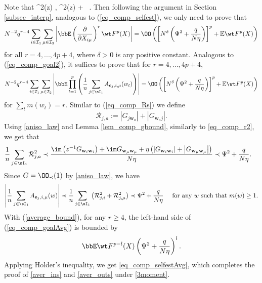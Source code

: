 Note that
\be\label{psi2}
\Psi^2(z) \lesssim {}, \quad {} \quad \Psi^2(z) \lesssim {} +  \ .
\ee
Then following the argument in Section \ref{subsec_interp}, analogous to (\ref{eq_comp_selfest}), we only need to prove that
\begin{equation}\label{eq_comp_selfestAvg}
N^{-2}q^{r-4}\sum_{i\in\mathcal I_1}\sum_{\mu\in\mathcal I_2}\left|\bbE \left(\frac{\partial}{\partial X_{i\mu}}\right)^r\wt F^p(X)\right|=\OO\left(\left[N^{\delta}\left(\Psi^2+\frac{q}{N\eta}\right)\right]^p+\mathbb E\wt F^p(X)\right)
\end{equation}
for all $r=4,...,4p+4$, where $\delta>0$ is any positive constant. Analogous to (\ref{eq_comp_goal2}), it suffices to prove that for $r=4,...,4p+4$,
\begin{equation}\label{eq_comp_goalAvg}
N^{-2}q^{r-4}\sum_{i\in\mathcal I_1}\sum_{\mu\in\mathcal I_2}\left|\bbE\prod_{t=1}^{p}\left(\frac{1}{n}\sum_{j\in\sI_1}A_{ \mathbf e_j, i, \mu}(w_t)\right)\right|=\OO\left(\left[N^{\delta}\left(\Psi^2+\frac{q}{N\eta}\right)\right]^p+\mathbb E\wt F^p(X)\right)
\end{equation}
for $\sum_t m(w_t)=r$. 
Similar to (\ref{eq_comp_Rs}) we define
\begin{equation}\nonumber%
\mathcal R_{j, a}:=| G_{j \mathbf w_a}|+| G_{\mathbf w_a j}|.
\end{equation}
Using \eqref{aniso_law} and Lemma \ref{lem_comp_gbound}, similarly to \eqref{eq_comp_r2}, we get that
\begin{equation}\label{eq_comp_r22}
\begin{split}
 \frac{1}{n}\sum_{j\in\sI_1}\mathcal R_{j,a}^2 & \prec \frac{ \im \left(z^{-1}G_{\mathbf w_i\mathbf w_i}\right) + \im G_{\mathbf w_\mu\mathbf w_\mu} + \eta\left(\left| G_{\mathbf w_i\mathbf w_i} \right|+ \left| G_{\mathbf w_\mu \mathbf w_\mu} \right|\right)}{N\eta} \prec \Psi^2+\frac{q}{N\eta}.
 \end{split}
\end{equation}
Since $G=\OO_\prec(1)$ by \eqref{aniso_law}, we have 
\begin{equation}\label{average_bound}
\left|\frac{1}{n}\sum_{j\in\sI_1}A_{ \mathbf e_j, i, \mu}(w)\right|\prec \frac{1}{n}\sum_{j\in\sI_1}\left(\mathcal R_{j,i}^2+\mathcal R_{j,\mu}^2\right)\prec \Psi^2 +\frac{q}{N\eta} \quad \text{ for any $w$ such that }m(w)\ge 1.
\end{equation}
With (\ref{average_bound}), for any $r\ge 4$, the left-hand side of (\ref{eq_comp_goalAvg}) is bounded by
\[\bbE\wt F^{p-l}(X)\left(\Psi^2+\frac{q}{N\eta}\right)^{l}.\]
Applying Holder's inequality, we get \eqref{eq_comp_selfestAvg}, which completes the proof of \eqref{aver_ins} and \eqref{aver_outs} under \eqref{3moment}. %


